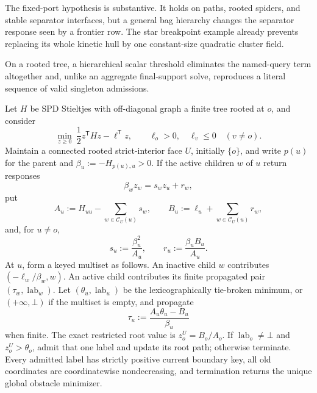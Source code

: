 The fixed-port hypothesis is substantive.  It holds on paths, rooted spiders,
and stable separator interfaces, but a general bag hierarchy changes the
separator response seen by a frontier row.  The star breakpoint example
already prevents replacing its whole kinetic hull by one constant-size
quadratic cluster field.

On a rooted tree, a hierarchical scalar threshold eliminates the named-query
term altogether and, unlike an aggregate final-support solve, reproduces a
literal sequence of valid singleton admissions.

\begin{theorem}
\label{thm:aesp-cd-tree-singleton-threshold}
Let $H$ be SPD Stieltjes with off-diagonal graph a finite tree rooted at $o$,
and consider
\begin{equation*}
 \min_{z\geq0}\ \frac12z^{\mathsf T}Hz-\ell^{\mathsf T}z,
 \qquad \ell_o>0,\quad \ell_v\leq0\quad(v\neq o).
\end{equation*}
Maintain a connected rooted strict-interior face $U$, initially $\{o\}$, and
write $p(u)$ for the parent and $\beta_u:=-H_{p(u),u}>0$.  If the active
children $w$ of $u$ return responses
\begin{equation*}
 \beta_w z_w=s_w z_u+r_w,
\end{equation*}
put
\begin{equation}
 A_u:=H_{uu}-\sum_{w\in\mathcal C_U(u)}s_w,\qquad
 B_u:=\ell_u+\sum_{w\in\mathcal C_U(u)}r_w,
 \label{eq:aesp-cd-tree-threshold-ab}
\end{equation}
and, for $u\neq o$,
\begin{equation*}
 s_u:=\frac{\beta_u^2}{A_u},\qquad
 r_u:=\frac{\beta_uB_u}{A_u}.
\end{equation*}
At $u$, form a keyed multiset as follows.  An inactive child $w$ contributes
$(-\ell_w/\beta_w,w)$.  An active child contributes its finite propagated
pair $(\tau_w,\operatorname{lab}_w)$.  Let
$(\theta_u,\operatorname{lab}_u)$ be the lexicographically tie-broken minimum,
or $(+\infty,\bot)$ if the multiset is empty, and propagate
\begin{equation}
 \tau_u:=\frac{A_u\theta_u-B_u}{\beta_u}
 \label{eq:aesp-cd-tree-threshold-propagate}
\end{equation}
when finite.  The exact restricted root value is $z_o^U=B_o/A_o$.
If $\operatorname{lab}_o\neq\bot$ and $z_o^U>\theta_o$, admit that one
label and update its root path; otherwise terminate.  Every admitted label
has strictly positive current boundary key, all old coordinates are
coordinatewise nondecreasing, and termination returns the unique global
obstacle minimizer.


\end{theorem}
